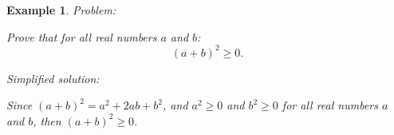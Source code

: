\documentclass{article}
\newtheorem{example}{Example}
\begin{document}



\begin{example}
Problem:
\begin{tcolorbox}[colback=yellow!10, width=\linewidth]
Prove that for all real numbers $a$ and $b$:
    $$(a+b)^2 \geq 0.$$
\end{tcolorbox}

Simplified solution:
\begin{tcolorbox}[colback=blue!10, width=\linewidth]
Since $(a+b)^2 = a^2 + 2ab + b^2$, and $a^2 \ge 0$ and $b^2 \ge 0$ for all real numbers $a$ and $b$, then $(a+b)^2 \ge 0$.

\end{tcolorbox}
\end{example}
\end{document}

